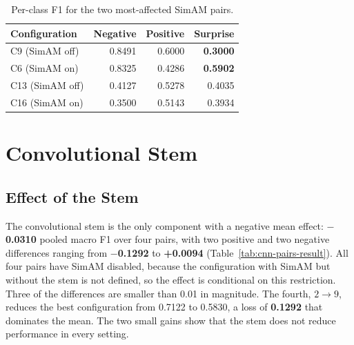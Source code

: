 \begin{table}[htbp]
	\centering
	\begin{tabular}{l r r r}
		\hline
		\textbf{Configuration} & \textbf{Negative} & \textbf{Positive} & \textbf{Surprise} \\
		\hline
		C9 (SimAM off)  & 0.8491 & 0.6000 & \textbf{0.3000} \\
		C6 (SimAM on)   & 0.8325 & 0.4286 & \textbf{0.5902} \\
		C13 (SimAM off) & 0.4127 & 0.5278 & 0.4035 \\
		C16 (SimAM on)  & 0.3500 & 0.5143 & 0.3934 \\
		\hline
	\end{tabular}
	\caption[Per-class F1 for the two most-affected SimAM pairs]{Per-class F1 for the two most-affected SimAM pairs.}
	\label{tab:simam-per-class}
\end{table}


\section{Convolutional Stem}
\label{sec:cnn-results}

\subsection{Effect of the Stem}
\label{sec:cnn-effect-result}
\label{sec:cnn-four-pairs}
\label{sec:cnn-worst-pair}
\label{sec:cnn-cost}

The convolutional stem is the only component with a negative mean effect: \textbf{$-$0.0310} pooled macro F1 over four pairs, with two positive and two negative differences ranging from \textbf{$-$0.1292} to \textbf{+0.0094} (Table~\ref{tab:cnn-pairs-result}). All four pairs have SimAM disabled, because the configuration with SimAM but without the stem is not defined, so the effect is conditional on this restriction. Three of the differences are smaller than 0.01 in magnitude. The fourth, $2\rightarrow9$, reduces the best configuration from 0.7122 to 0.5830, a loss of \textbf{0.1292} that dominates the mean. The two small gains show that the stem does not reduce performance in every setting.

